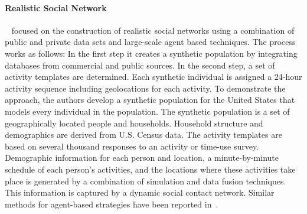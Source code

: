 
\paragraph{Realistic Social Network}
~\cite{Barrett:2009:GAL:1995456.1995598} focused on the construction of
realistic social networks using a combination of public and private data sets
and large-scale agent based techniques. The process works as follows: In the first step
it creates a synthetic population by integrating databases from commercial and
public sources. In the second step, a set of activity templates are determined. Each
synthetic individual is assigned a 24-hour activity sequence including
geolocations for each activity. To demonstrate the approach, the authors develop a synthetic population for the
United States that models every individual in the population. The synthetic
population is a set of geographically located people and households. Household
structure and demographics are derived from U.S. Census data. The activity
templates are  based on several thousand responses to an activity or time-use
survey. Demographic information for each person and location, a minute-by-minute
schedule of each person's activities, and the locations where these activities
take place is generated by a combination of simulation and data fusion
techniques. This information is captured by a dynamic social contact network. Similar methods for agent-based strategies have been reported in~\cite{Bernstein:2013:SAS:2499604.2499609}.

